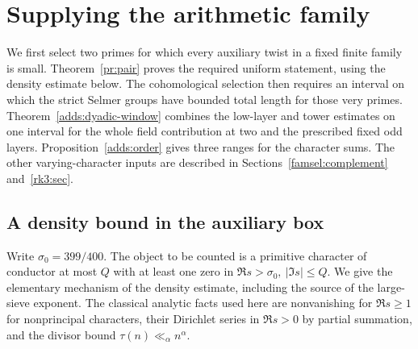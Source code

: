 \section{Supplying the arithmetic family}\label{sup:section}

We first select two primes for which every auxiliary twist in a fixed finite family is small. Theorem~\ref{pr:pair} proves the required uniform statement, using the density estimate below. The cohomological selection then requires an interval on which the strict Selmer groups have bounded total length for those very primes. Theorem~\ref{adds:dyadic-window} combines the low-layer and tower estimates on one interval for the whole field contribution at two and the prescribed fixed odd layers. Proposition~\ref{adds:order} gives three ranges for the character sums. The other varying-character inputs are described in Sections~\ref{famsel:complement} and~\ref{rk3:sec}.

\subsection{A density bound in the auxiliary box}

Write \(\sigma_0=399/400\). The object to be counted is a primitive character of conductor at most \(Q\) with at least one zero in \(\Re s>\sigma_0,\ |\Im s|\le Q\). We give the elementary mechanism of the density estimate, including the source of the large-sieve exponent. The classical analytic facts used here are nonvanishing for \(\Re s\ge1\) for nonprincipal characters, their Dirichlet series in \(\Re s>0\) by partial summation, and the divisor bound \(\tau(n)\ll_\alpha n^\alpha\). 

